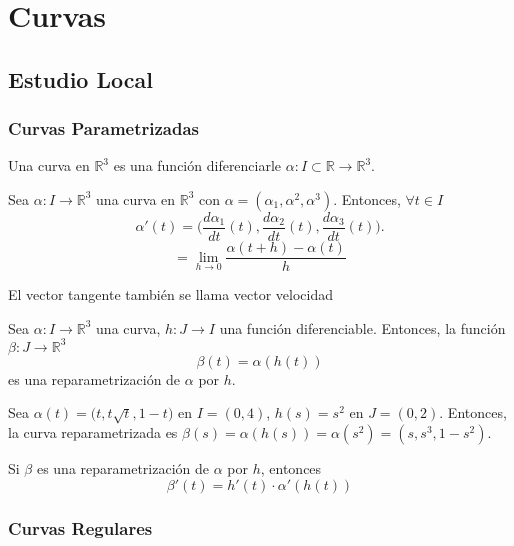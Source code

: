 \part{Curvas}
\chapter{Estudio Local}
\section{Curvas Parametrizadas}

\begin{defn}[Curva]
  Una curva en $\mathbb{R}^{3}$ es una función diferenciarle $\alpha: I \subset \mathbb{R} \to \mathbb{R}^{3}$.
\end{defn}

\begin{defn}
  Sea $\alpha: I \to \mathbb{R}^{3}$ una curva en $\mathbb{R}^{3}$ con $\alpha = (\alpha_{1}, \alpha^{2}, \alpha^{3})$. Entonces, $\forall t \in I$
  \[ 
    \alpha'(t) = \Big ( \frac{d{\alpha_{1}}}{d{t}}(t),\frac{d{\alpha_{2}}}{d{t}}(t),\frac{d{\alpha_{3}}}{d{t}}(t) \Big ).
  \] 
  \[ 
    = \lim_{h \to 0} \frac{\alpha(t+ h) - \alpha(t)}{h} 
  \] 
\end{defn}

\begin{obs}
  El vector tangente también se llama vector velocidad
\end{obs}

\begin{defn}[Reparametrización]
  Sea $\alpha: I \to \mathbb{R}^{3}$ una curva, $h: J \to I$ una función diferenciable. Entonces, la función $\beta: J \to \mathbb{R}^{3}$
  \[ 
    \beta(t) = \alpha(h(t)) 
  \] 
  es una reparametrización de $\alpha$ por $h$.
\end{defn}

\begin{ejm}
  Sea $\alpha(t) = \big ( t , t \sqrt{t}, 1-t \big )$ en $I = (0,4)$, $h(s) = s^{2}$ en $J = ( 0,2 )$. Entonces, la curva reparametrizada es $\beta(s) = \alpha(h(s)) = \alpha(s^{2}) = ( s, s^{3}, 1 -s^{2} )$.
\end{ejm}

\begin{lem}
  Si $\beta$ es una reparametrización de $\alpha$ por $h$, entonces
  \[ 
    \beta'(t) = h'(t)\cdot \alpha'(h(t)) 
  \] 
\end{lem}

\section{Curvas Regulares}

